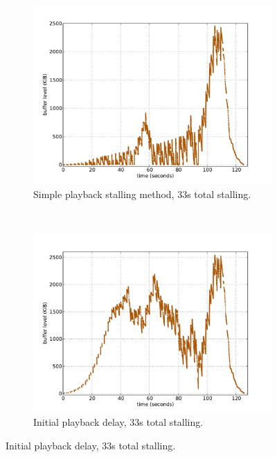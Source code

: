 \begin{figure}[htbp]
	\centering
    	\begin{subfigure}[b]{0.50\textwidth}
                \centering
                \includegraphics[width=\textwidth]{images/bufferlevel-stall-new.pdf}
                \caption{Simple playback stalling method, 33s total stalling.}
                \label{c1:fig:expose-bufferlevel-stall}
        \end{subfigure}%
        ~
    	\begin{subfigure}[b]{0.50\textwidth}
                \centering
                \includegraphics[width=\textwidth]{images/bufferlevel-startdelay-new.pdf}
                \caption{Initial playback delay, 33s total stalling.}
                \label{c1:fig:expose-bufferlevel-startdelay}
        \end{subfigure}


\end{figure}

